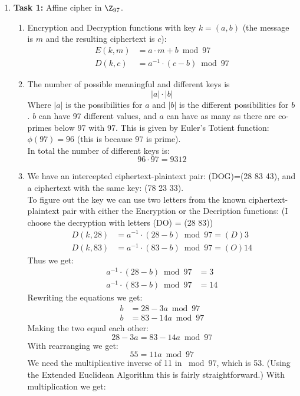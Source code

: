 \documentclass{article}
\begin{document}
\homeworktitle

\begin{enumerate}[label={}]
	\item \textbf{Task 1:} Affine cipher in $\Z_{97}$.\\
	\begin{enumerate}
		\item Encryption and Decryption functions with key $k=(a,b)$ (the message is $m$ and the resulting ciphertext is $c$):
		\begin{align*}
			E(k, m) &= a \cdot m + b \bmod 97\\
			D(k, c) &= a^{-1} \cdot (c - b) \bmod 97
		\end{align*}
		\item The number of possible meaningful and different keys is \[ \lvert a \rvert \cdot \lvert b \rvert \]
		Where $\lvert a \rvert$ is the possibilities for $a$ and $\lvert b \rvert$ is the different possibilities for $b$. $b$ can have 97 different values, and $a$ can have as many as there are co-primes below 97 with 97. This is given by Euler's Totient function: $\phi(97) = 96$ (this is because 97 is prime).\\
		In total the number of different keys is: 
		\[96 \cdot 97 = 9312\]
		\item We have an intercepted ciphertext-plaintext pair: (DOG)=(28 83 43), and a ciphertext with the same key: (78 23 33).\\
		To figure out the key we can use two letters from the known ciphertext-plaintext pair with either the Encryption or the Decription functions: (I choose the decryption with letters (DO) = (28 83))
		\begin{align*}
			D(k, 28) &= a^{-1} \cdot (28 - b) \bmod 97 = (D)3\\
			D(k, 83) &= a^{-1} \cdot (83 - b) \bmod 97 = (O)14
		\end{align*}
		Thus we get:
		\begin{align*}
				a^{-1} \cdot (28 - b) \bmod 97 &= 3\\
				a^{-1} \cdot (83 - b) \bmod 97 &= 14
		\end{align*}
		Rewriting the equations we get:
		\begin{align*}
			b &= 28 - 3a \bmod 97\\
			b &= 83 - 14a \bmod 97
		\end{align*}
		Making the two equal each other:
		\[28 - 3a = 83 - 14a \bmod 97\]
		With rearranging we get:
		\[55 = 11a \bmod 97\]
		We need the multiplicative inverse of 11 in $\bmod 97$, which is 53. (Using the Extended Euclidean Algorithm this is fairly straightforward.) With multiplication we get:

\end{enumerate}
\end{enumerate}
\end{document}
